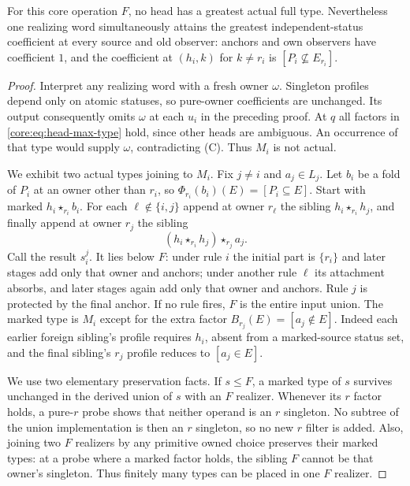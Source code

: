 \begin{theorem}
\label{core:thm:head-types}
For this core operation $F$, no head has a greatest actual full type.
Nevertheless one realizing word simultaneously attains the greatest
independent-status coefficient at every source and old observer:
anchors and own observers have coefficient $1$, and the coefficient
at $(h_i,k)$ for $k\ne r_i$ is $[P_i\nsubseteq E_{r_i}]$.
\end{theorem}
\begin{proof}
Interpret any realizing word with a fresh owner $\omega$. Singleton
profiles depend only on atomic statuses, so pure-owner coefficients
are unchanged. Its output consequently omits $\omega$ at each $u_i$
in the preceding proof. At $q$ all factors in
\eqref{core:eq:head-max-type} hold, since other heads are ambiguous.
An occurrence of that type would supply $\omega$, contradicting (C).
Thus $M_i$ is not actual.

We exhibit two actual types joining to $M_i$. Fix $j\ne i$ and
$a_j\in L_j$. Let $b_i$ be a fold of $P_i$ at an owner other than
$r_i$, so $\Phi_{r_i}(b_i)(E)=[P_i\subseteq E]$.
Start with marked $h_i\star_{r_i}b_i$. For each
$\ell\notin\{i,j\}$ append at owner $r_\ell$ the sibling
$h_i\star_{r_i}h_j$, and finally append at owner $r_j$ the sibling
\[
 (h_i\star_{r_i}h_j)\star_{r_j}a_j.
\]
Call the result $s_i^j$. It lies below $F$: under rule $i$ the initial
part is $\{r_i\}$ and later stages add only that owner and anchors;
under another rule $\ell$ its attachment absorbs, and later stages
again add only that owner and anchors. Rule $j$ is protected by the
final anchor. If no rule fires, $F$ is the entire input union.
The marked type is $M_i$ except for the extra factor
$B_{r_j}(E)=[a_j\notin E]$. Indeed each earlier foreign sibling's
profile requires $h_i$, absent from a marked-source status set, and
the final sibling's $r_j$ profile reduces to $[a_j\in E]$.

We use two elementary preservation facts. If $s\leq F$, a marked
type of $s$ survives unchanged in the derived union of $s$ with an
$F$ realizer. Whenever its $r$ factor holds, a pure-$r$ probe shows
that neither operand is an $r$ singleton. No subtree of the union
implementation is then an $r$ singleton, so no new $r$ filter is added.
Also, joining two $F$ realizers by any primitive owned choice preserves
their marked types: at a probe where a marked factor holds, the sibling
$F$ cannot be that owner's singleton. Thus finitely many types can
be placed in one $F$ realizer.


\end{proof}
